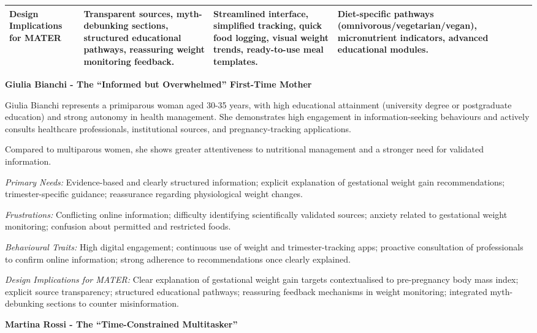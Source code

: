 \documentclass[11pt]{article}
\begin{document}
\begin{table}[ht]
\begin{tabular}{p{3cm}p{3.8cm}p{3.8cm}p{3.8cm}}
\textbf{Design Implications for MATER} &
Transparent sources, myth-debunking sections, structured educational pathways, reassuring weight monitoring feedback. &
Streamlined interface, simplified tracking, quick food logging, visual weight trends, ready-to-use meal templates. &
Diet-specific pathways (omnivorous/vegetarian/vegan), micronutrient indicators, advanced educational modules. \\

\hline
\end{tabular}
\end{table}

\textbf{Giulia Bianchi - The ``Informed but Overwhelmed'' First-Time Mother}

Giulia Bianchi represents a primiparous woman aged 30-35 years, with high educational attainment (university degree or postgraduate education) and strong autonomy in health management. She demonstrates high engagement in information-seeking behaviours and actively consults healthcare professionals, institutional sources, and pregnancy-tracking applications.

Compared to multiparous women, she shows greater attentiveness to nutritional management and a stronger need for validated information.

\textit{Primary Needs:}
Evidence-based and clearly structured information; explicit explanation of gestational weight gain recommendations; trimester-specific guidance; reassurance regarding physiological weight changes.

\textit{Frustrations:}
Conflicting online information; difficulty identifying scientifically validated sources; anxiety related to gestational weight monitoring; confusion about permitted and restricted foods.

\textit{ Behavioural Traits:}
High digital engagement; continuous use of weight and trimester-tracking apps; proactive consultation of professionals to confirm online information; strong adherence to recommendations once clearly explained.

\textit{Design Implications for MATER:}
Clear explanation of gestational weight gain targets contextualised to pre-pregnancy body mass index; explicit source transparency; structured educational pathways; reassuring feedback mechanisms in weight monitoring; integrated myth-debunking sections to counter misinformation.

\vspace{0.5em}

\textbf{Martina Rossi - The ``Time-Constrained Multitasker''}
\end{document}

